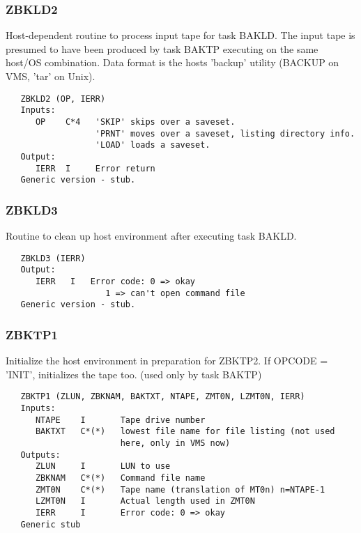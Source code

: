 \subsubsection{ZBKLD2}
Host-dependent routine to process input tape for task BAKLD.
The input tape is presumed to have been produced by task BAKTP
executing on the same host/OS combination. Data format is the
hosts 'backup' utility (BACKUP on VMS, 'tar' on Unix).
\begin{verbatim}
   ZBKLD2 (OP, IERR)
   Inputs:
      OP    C*4   'SKIP' skips over a saveset.
                  'PRNT' moves over a saveset, listing directory info.
                  'LOAD' loads a saveset.
   Output:
      IERR  I     Error return
   Generic version - stub.
\end{verbatim}

\subsubsection{ZBKLD3}
Routine to clean up host environment after executing task BAKLD.
\begin{verbatim}
   ZBKLD3 (IERR)
   Output:
      IERR   I   Error code: 0 => okay
                    1 => can't open command file
   Generic version - stub.
\end{verbatim}

\subsubsection{ZBKTP1}
Initialize the host environment in preparation for ZBKTP2.  If
OPCODE = 'INIT', initializes the tape too.
(used only by task BAKTP)
\begin{verbatim}
   ZBKTP1 (ZLUN, ZBKNAM, BAKTXT, NTAPE, ZMT0N, LZMT0N, IERR)
   Inputs:
      NTAPE    I       Tape drive number
      BAKTXT   C*(*)   lowest file name for file listing (not used
                       here, only in VMS now)
   Outputs:
      ZLUN     I       LUN to use
      ZBKNAM   C*(*)   Command file name
      ZMT0N    C*(*)   Tape name (translation of MT0n) n=NTAPE-1
      LZMT0N   I       Actual length used in ZMT0N
      IERR     I       Error code: 0 => okay
   Generic stub
\end{verbatim}


